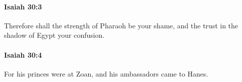 		\paragraph{Isaiah 30:3} %
			\label{ISAIAH-30-3}

			Therefore shall the strength of Pharaoh be your shame, and the trust in the shadow of Egypt your confusion.


		\paragraph{Isaiah 30:4} %
			\label{ISAIAH-30-4}

			For his princes were at Zoan, and his ambassadors came to Hanes.


